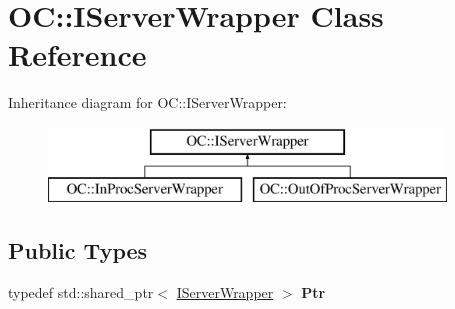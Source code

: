 \hypertarget{classOC_1_1IServerWrapper}{}\section{O\+C\+:\+:I\+Server\+Wrapper Class Reference}
\label{classOC_1_1IServerWrapper}
Inheritance diagram for O\+C\+:\+:I\+Server\+Wrapper\+:\begin{figure}[H]
\begin{center}
\leavevmode
\includegraphics[height=2.000000cm]{classOC_1_1IServerWrapper}
\end{center}
\end{figure}
\subsection*{Public Types}
\begin{DoxyCompactItemize}
\item 
\hypertarget{classOC_1_1IServerWrapper_aa2ec7da5becc94eb6da851384741bbb4}{}typedef std\+::shared\+\_\+ptr$<$ \hyperlink{classOC_1_1IServerWrapper}{I\+Server\+Wrapper} $>$ {\bfseries Ptr}\label{classOC_1_1IServerWrapper_aa2ec7da5becc94eb6da851384741bbb4}

\end{DoxyCompactItemize}
